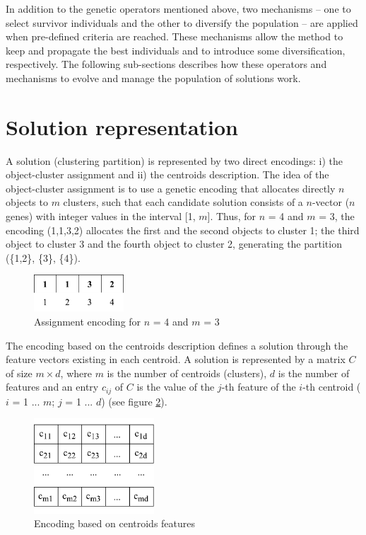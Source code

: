 In addition to the genetic operators mentioned above, two mechanisms -- one to select survivor individuals and the other to diversify the population -- are applied when pre-defined criteria are reached. These mechanisms allow the method to keep and propagate the best individuals and to introduce some diversification, respectively. The following sub-sections describes how these operators and mechanisms to evolve and manage the population of solutions work.

\section{Solution representation}
A solution (clustering partition) is represented by two direct encodings: i) the object-cluster assignment and ii) the centroids description. The idea of the object-cluster assignment is to use a genetic encoding that allocates directly $n$ objects to $m$ clusters, such that each candidate solution consists of a $n$-vector ($n$ genes) with integer values in the interval [1, $m$]. Thus, for $n$ = 4 and $m$ = 3, the encoding (1,1,3,2) allocates the first and the second objects to cluster 1; the third object to cluster 3 and the fourth object to cluster 2, generating the partition (\{1,2\}, \{3\}, \{4\}).

\begin{figure}[h]
  \begin{center}
    \includegraphics[width=0.3\textwidth]{img/assignment-encoding}
    \caption{Assignment encoding for $n$ = 4 and $m$ = 3}\label{fig:assignment-encoding}
  \end{center}
\end{figure}

The encoding based on the centroids description defines a solution through the feature vectors existing in each centroid. A solution is represented by a matrix $C$ of size $m \times d$, where $m$ is the number of centroids (clusters), $d$ is the number of features and an entry $c_{ij}$ of $C$ is the value of the $j$-th feature of the $i$-th centroid ($i$ = 1 ... $m$; $j$ = 1 ... $d$) (see figure \ref{fig:centroids-encoding}).

\begin{figure}[h]
  \begin{center}
    \includegraphics[width=0.4\textwidth]{img/centroids-encoding}
    \caption{Encoding based on centroids features}\label{fig:centroids-encoding}
  \end{center}
\end{figure}

